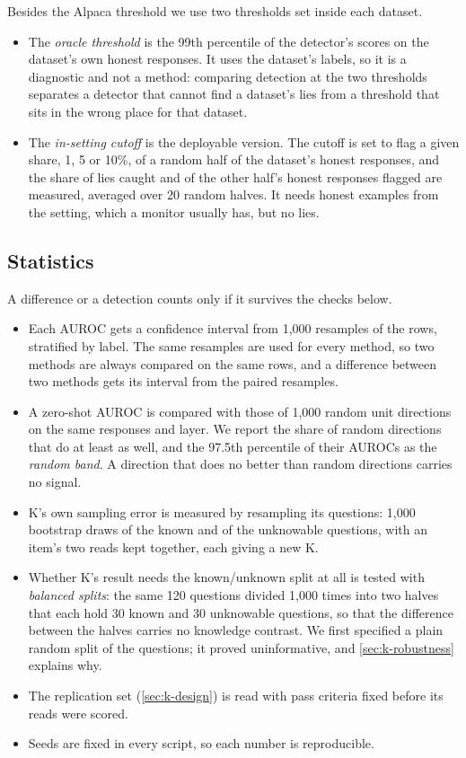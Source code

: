Besides the Alpaca threshold we use two thresholds set inside each dataset.
\begin{itemize}[leftmargin=1.6em, itemsep=2pt]
\item The \emph{oracle threshold} is the 99th percentile of the detector's scores on the dataset's own
  honest responses. It uses the dataset's labels, so it is a diagnostic and not a method: comparing
  detection at the two thresholds separates a detector that cannot find a dataset's lies from a
  threshold that sits in the wrong place for that dataset.
\item The \emph{in-setting cutoff} is the deployable version. The cutoff is set to flag a given share,
  1, 5 or 10\%, of a random half of the dataset's honest responses, and the share of lies caught and of
  the other half's honest responses flagged are measured, averaged over 20 random halves. It needs
  honest examples from the setting, which a monitor usually has, but no lies.
\end{itemize}

\subsection{Statistics}
\label{sec:stats-methods}

A difference or a detection counts only if it survives the checks below.
\begin{itemize}[leftmargin=1.6em, itemsep=2pt]
\item Each AUROC gets a confidence interval from 1,000 resamples of the rows, stratified by label.
  The same resamples are used for every method, so two methods are always compared on the same
  rows, and a difference between two methods gets its interval from the paired resamples.
\item A zero-shot AUROC is compared with those of 1,000 random unit directions on the same responses
  and layer. We report the share of random directions that do at least as well, and the 97.5th
  percentile of their AUROCs as the \emph{random band}. A direction that does no better than random
  directions carries no signal.
\item K's own sampling error is measured by resampling its questions: 1,000 bootstrap draws of the
  known and of the unknowable questions, with an item's two reads kept together, each giving a new K.
\item Whether K's result needs the known/unknown split at all is tested with \emph{balanced splits}:
  the same 120 questions divided 1,000 times into two halves that each hold 30 known and 30
  unknowable questions, so that the difference between the halves carries no knowledge contrast. We
  first specified a plain random split of the questions; it proved uninformative, and
  \cref{sec:k-robustness} explains why.
\item The replication set (\cref{sec:k-design}) is read with pass criteria fixed before its reads were
  scored.
\item Seeds are fixed in every script, so each number is reproducible.
\end{itemize}

